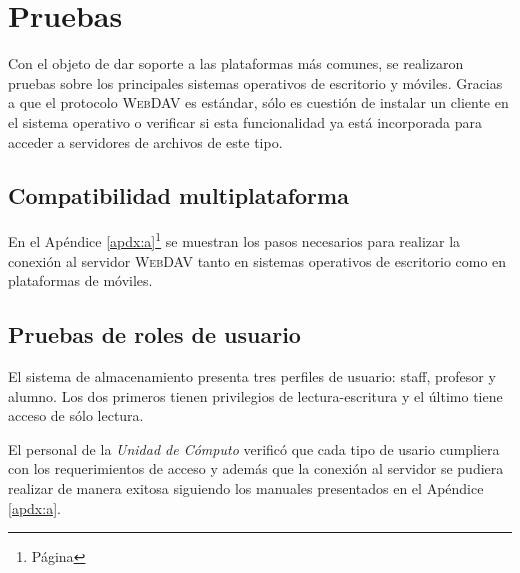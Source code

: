 {
  \linespread{1}
  \cleardoublepage  
  \chapter{Pruebas}
  \label{chap:cap4}
}

Con el objeto de dar soporte a las plataformas m\'{a}s comunes, se realizaron pruebas sobre los principales sistemas operativos de escritorio y m\'{o}viles. Gracias a que el protocolo \textsc{WebDAV} es est\'{a}ndar, s\'{o}lo es cuesti\'{o}n de instalar un cliente en el sistema operativo o verificar si esta funcionalidad ya est\'{a} incorporada para acceder a servidores de archivos de este tipo.

    \section {Compatibilidad multiplataforma}

En el \textup{Ap\'{e}ndice \ref{apdx:a}}\footnote{P\'{a}gina \pageref{apdx:a}} se muestran los pasos necesarios para realizar la conexi\'{o}n al servidor \textsc{WebDAV} tanto en sistemas operativos de escritorio como en plataformas de m\'{o}viles.

    \section {Pruebas de roles de usuario}

El sistema de almacenamiento presenta tres perfiles de usuario: staff, profesor y alumno. Los dos primeros tienen privilegios de lectura-escritura y el \'{u}ltimo tiene acceso de s\'{o}lo lectura.

El personal de la \emph{Unidad de C\'{o}mputo} verific\'{o} que cada tipo de usario cumpliera con los requerimientos de acceso y adem\'{a}s que la conexi\'{o}n al servidor se pudiera realizar de manera exitosa siguiendo los manuales presentados en el \textup{Ap\'{e}ndice \ref{apdx:a}}.

{
 \linespread{1}
 \begin{table}[H]
 \caption{Perfiles de usuario y tipo de acceso}{}
 \label{tab:user-profiles}
 \noindent{} %
 \end{table}
}

